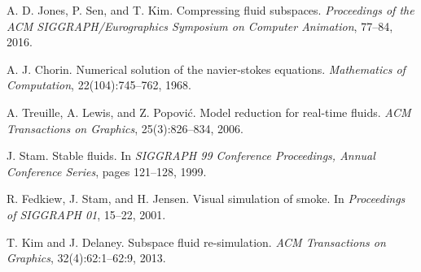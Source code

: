 \documentclass[aspectratio=169,dvipdfmx,hyperref={bookmarks=true}]{beamer}
\begin{document}
\begin{thebibliography}{99}
\beamertemplatetextbibitems
{}
A. D. Jones, P. Sen, and T. Kim. Compressing fluid subspaces. \textit{Proceedings of the ACM SIGGRAPH/Eurographics Symposium on Computer Animation}, 77--84, 2016.

A. J. Chorin. Numerical solution of the navier-stokes equations. \textit{Mathematics of Computation}, 22(104):745--762, 1968.

A. Treuille, A. Lewis, and Z. Popovi\'{c}. Model reduction for real-time fluids. \textit{ACM Transactions on Graphics}, 25(3):826--834, 2006.

J. Stam. Stable fluids. In \textit{SIGGRAPH 99 Conference Proceedings, Annual Conference Series}, pages 121--128, 1999.

R. Fedkiew, J. Stam, and H. Jensen. Visual simulation of smoke. In \textit{Proceedings of SIGGRAPH 01}, 15--22, 2001.

T. Kim and J. Delaney. Subspace fluid re-simulation. \textit{ACM Transactions on Graphics}, 32(4):62:1--62:9, 2013.


\end{thebibliography}
\end{document}
